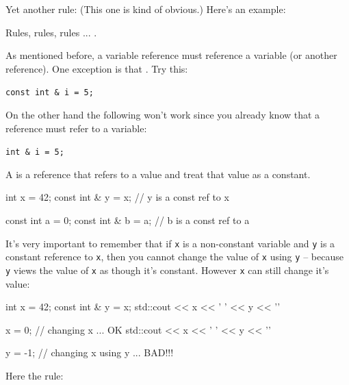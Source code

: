 
Yet another rule:  (This one is kind of obvious.) Here's an example:


Rules, rules, rules ... .






As mentioned before, a variable reference must reference a variable (or another reference). One exception is that . Try this:

\verb!const int & i = 5;!

On the other hand the following won't work since you
already know that a reference must refer to a variable:

\verb!int & i = 5;!

A  is a reference that refers to a value and
treat that value as a constant.

\begin{consolethree}[escapeinside=||]
int x = 42;
const int & y = x; // y is a const ref to x

const int a = 0;
const int & b = a; // b is a const ref to a
\end{consolethree}

It's very important to remember that if \texttt{x} is a non-constant variable and \texttt{y} is a constant reference to \texttt{x}, then you cannot change the value of \texttt{x} using \texttt{y} -- because \texttt{y} views the value of \texttt{x} as though it's constant. However \texttt{x} can still change it's value:

\begin{consolethree}[escapeinside=||]
int x = 42;
const int & y = x;
std::cout << x << ' ' << y << '\n'

x = 0; // changing x ... OK
std::cout << x << ' ' << y << '\n'

y = -1; // changing x using y ... BAD!!!
\end{consolethree}



Here the rule: 


